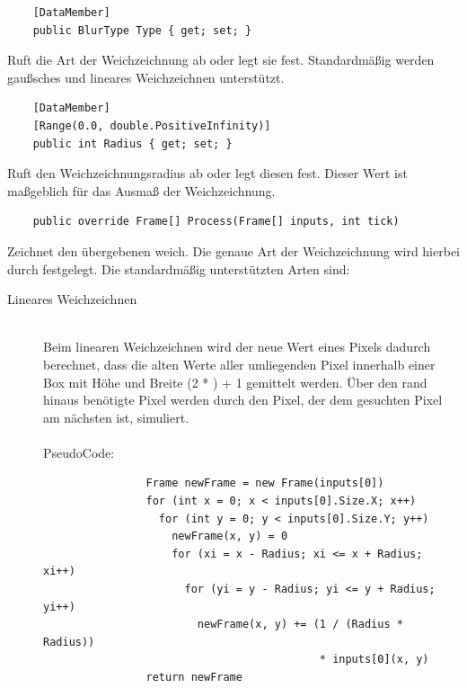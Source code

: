 \begin{itemize}

	\begin{verbatim}
	[DataMember]
	public BlurType Type { get; set; }
	\end{verbatim}
	Ruft die Art der Weichzeichnung ab oder legt sie fest. Standardmäßig werden gaußsches und lineares Weichzeichnen unterstützt.
	
	\begin{verbatim}
	[DataMember]
	[Range(0.0, double.PositiveInfinity)]
	public int Radius { get; set; }
	\end{verbatim}
	Ruft den Weichzeichnungsradius ab oder legt diesen fest. Dieser Wert ist maßgeblich für das Ausmaß der Weichzeichnung.

	\begin{verbatim}
	public override Frame[] Process(Frame[] inputs, int tick)
	\end{verbatim}
	Zeichnet den übergebenen  weich. Die genaue Art der Weichzeichnung wird hierbei durch  festgelegt. Die standardmäßig unterstützten Arten sind:
	\begin{description}
		\item[Lineares Weichzeichnen]~\\
			Beim linearen Weichzeichnen wird der neue Wert eines Pixels dadurch berechnet, dass die alten Werte aller umliegenden Pixel innerhalb einer Box mit Höhe und Breite (2 * ) + 1 gemittelt werden. Über den rand hinaus benötigte Pixel werden durch den Pixel, der dem gesuchten Pixel am nächsten ist, simuliert. ~\\~\\
			PseudoCode:
			\begin{verbatim}
				Frame newFrame = new Frame(inputs[0])
				for (int x = 0; x < inputs[0].Size.X; x++)
				  for (int y = 0; y < inputs[0].Size.Y; y++)
				    newFrame(x, y) = 0
				    for (xi = x - Radius; xi <= x + Radius; xi++)
				      for (yi = y - Radius; yi <= y + Radius; yi++)
				        newFrame(x, y) += (1 / (Radius * Radius))
				                           * inputs[0](x, y)
				return newFrame
				

\end{verbatim}
\end{description}
\end{itemize}
